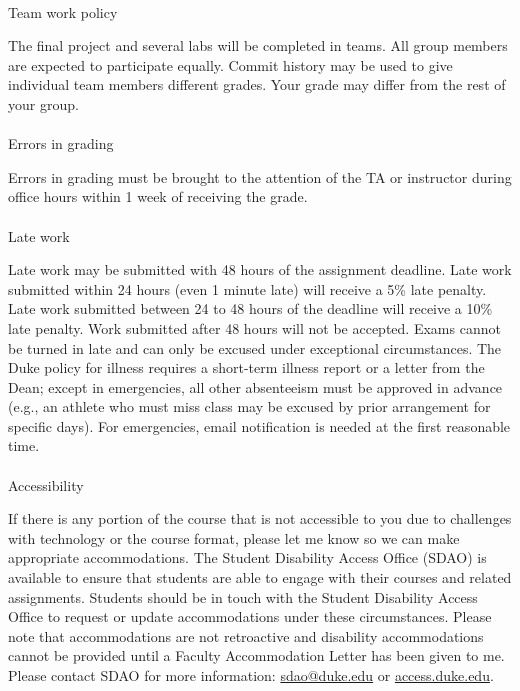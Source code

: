 \documentclass[
  12pt,
  letterpaper,
  DIV=11,
  numbers=noendperiod]{scrartcl}
\makeatletter
\let\oldparagraph\paragraph
\renewcommand{\paragraph}{
    \@ifstar
      \xxxParagraphStar
      \xxxParagraphNoStar
  }
\newcommand{\xxxParagraphStar}[1]{\oldparagraph*{#1}\mbox{}}
\newcommand{\xxxParagraphNoStar}[1]{\oldparagraph{#1}\mbox{}}
\makeatother
\begin{document}
\paragraph{Team work policy}\label{team-work-policy}

The final project and several labs will be completed in teams. All group
members are expected to participate equally. Commit history may be used
to give individual team members different grades. Your grade may differ
from the rest of your group.

\paragraph{Errors in grading}\label{errors-in-grading}

Errors in grading must be brought to the attention of the TA or
instructor during office hours within 1 week of receiving the grade.

\paragraph{Late work}\label{late-work}

Late work may be submitted with 48 hours of the assignment deadline.
Late work submitted within 24 hours (even 1 minute late) will receive a
5\% late penalty. Late work submitted between 24 to 48 hours of the
deadline will receive a 10\% late penalty. Work submitted after 48 hours
will not be accepted. Exams cannot be turned in late and can only be
excused under exceptional circumstances. The Duke policy for illness
requires a short-term illness report or a letter from the Dean; except
in emergencies, all other absenteeism must be approved in advance (e.g.,
an athlete who must miss class may be excused by prior arrangement for
specific days). For emergencies, email notification is needed at the
first reasonable time.

\paragraph{Accessibility}\label{accessibility}

If there is any portion of the course that is not accessible to you due
to challenges with technology or the course format, please let me know
so we can make appropriate accommodations. The Student Disability Access
Office (SDAO) is available to ensure that students are able to engage
with their courses and related assignments. Students should be in touch
with the Student Disability Access Office to request or update
accommodations under these circumstances. Please note that
accommodations are not retroactive and disability accommodations cannot
be provided until a Faculty Accommodation Letter has been given to me.
Please contact SDAO for more information: \url{sdao@duke.edu} or
\href{https://access.duke.edu}{access.duke.edu}.
\end{document}
